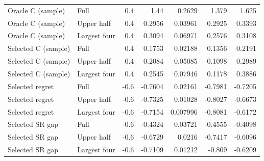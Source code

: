 \begin{table}[p]
{\begin{tabular}{llrrrrr}
Oracle C (sample) & Full & 0.4 & 1.44 & 0.2629 & 1.379 & 1.625 \\
Oracle C (sample) & Upper half & 0.4 & 0.2956 & 0.03961 & 0.2925 & 0.3393 \\
Oracle C (sample) & Largest four & 0.4 & 0.3094 & 0.06971 & 0.2576 & 0.3108 \\
Selected C (sample) & Full & 0.4 & 0.1753 & 0.02188 & 0.1356 & 0.2191 \\
Selected C (sample) & Upper half & 0.4 & 0.2084 & 0.05085 & 0.1098 & 0.2989 \\
Selected C (sample) & Largest four & 0.4 & 0.2545 & 0.07946 & 0.1178 & 0.3886 \\
Selected regret & Full & -0.6 & -0.7604 & 0.02161 & -0.7981 & -0.7205 \\
Selected regret & Upper half & -0.6 & -0.7325 & 0.01028 & -0.8027 & -0.6673 \\
Selected regret & Largest four & -0.6 & -0.7154 & 0.007996 & -0.8081 & -0.6172 \\
Selected SR gap & Full & -0.6 & -0.4324 & 0.03721 & -0.4555 & -0.4098 \\
Selected SR gap & Upper half & -0.6 & -0.6729 & 0.0216 & -0.7417 & -0.6096 \\
Selected SR gap & Largest four & -0.6 & -0.7109 & 0.01212 & -0.809 & -0.6209 \\
\bottomrule
\end{tabular}
}
\ifdim\wd\simtablebox>\linewidth
\resizebox{\linewidth}{!}{\usebox{\simtablebox}}
\else\usebox{\simtablebox}\fi
\endgroup
\end{table}
